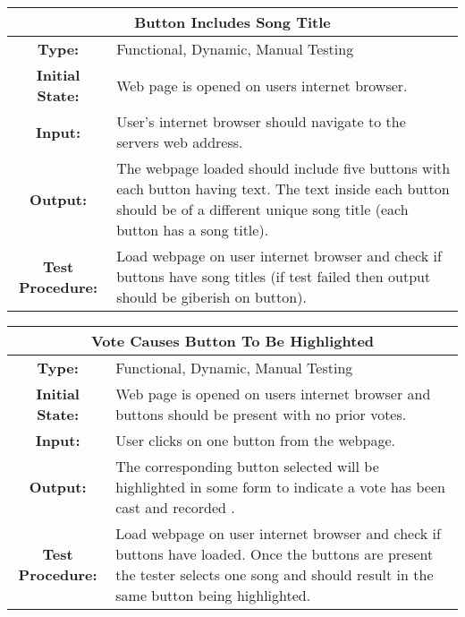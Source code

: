 \documentclass[12pt, titlepage]{article}
\begin{document}
\begin{center}
\begin{table}[H]
\begin{tabularx}{\textwidth}{| c X |}
\hline
\multicolumn{2}{|c|}{\textbf{Button Includes Song Title}}\\
\hline
\textbf{Type: } & Functional, Dynamic, Manual Testing\\

\textbf{Initial State: } & Web page is opened on users internet browser.\\

\textbf{Input: } & User's internet browser should navigate to the servers web address.\\

\textbf{Output: } & The webpage loaded should include five buttons with each button having text. The text inside each button should be of a different unique song title (each button has a song title).\\

\textbf{Test Procedure:  } & Load webpage on user internet browser and check if buttons have song titles (if test failed then output should be giberish on button).\\
\hline
\end{tabularx}
\end{table}
\end{center}



\begin{center}
\begin{table}[H]
\begin{tabularx}{\textwidth}{| c X |}
\hline
\multicolumn{2}{|c|}{\textbf{Vote Causes Button To Be Highlighted}}\\
\hline
\textbf{Type: } & Functional, Dynamic, Manual Testing\\

\textbf{Initial State: } & Web page is opened on users internet browser and buttons should be present with no prior votes.\\

\textbf{Input: } & User clicks on one button from the webpage.\\

\textbf{Output: } & The corresponding button selected will be highlighted in some form to indicate a vote has been cast and recorded .\\

\textbf{Test Procedure:  } & Load webpage on user internet browser and check if buttons have loaded. Once the buttons are present the tester selects one song and should result in the same button being highlighted.\\
\hline
\end{tabularx}
\end{table}
\end{center}
\end{document}
